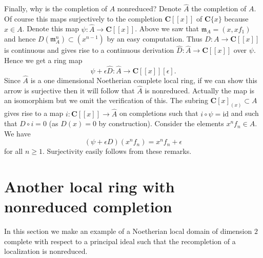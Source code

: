 \medskip\noindent
Finally, why is the completion of $A$ nonreduced? Denote $\hat A$ the
completion of $A$. Of course this maps surjectively to the completion
$\mathbf{C}[[x]]$ of $\mathbf{C}\{x\}$ because $x \in A$. Denote
this map $\psi : \hat A \to \mathbf{C}[[x]]$.
Above we saw that $\mathfrak m_A = (x, xf_1)$
and hence $D(\mathfrak m_A^n) \subset (x^{n - 1})$ by an easy
computation. Thus $D : A \to \mathbf{C}[[x]]$ is continuous and
gives rise to a continuous derivation $\hat D : \hat A \to \mathbf{C}[[x]]$
over $\psi$. Hence we get a ring map
$$
\psi + \epsilon \hat D :
\hat A
\longrightarrow
\mathbf{C}[[x]][\epsilon].
$$
Since $\hat A$ is a one dimensional Noetherian complete local ring, if we
can show this arrow is surjective then it will follow that $\hat A$
is nonreduced. Actually the map is an isomorphism but we omit the
verification of this. The subring $\mathbf{C}[x]_{(x)} \subset A$
gives rise to a map $i : \mathbf{C}[[x]] \to \hat A$ on completions such
that $i \circ \psi = \text{id}$ and such that $D \circ i = 0$
(as $D(x) = 0$ by construction). Consider the elements $x^nf_n \in A$.
We have
$$
(\psi + \epsilon D)(x^nf_n) = x^n f_n + \epsilon
$$
for all $n \geq 1$. Surjectivity easily follows from these remarks.





\section{Another local ring with nonreduced completion}
\label{section-another-local-completion-nonreduced}

\noindent
In this section we make an example of a Noetherian local domain
of dimension $2$ complete with respect to a principal ideal
such that the recompletion of a localization is nonreduced.

